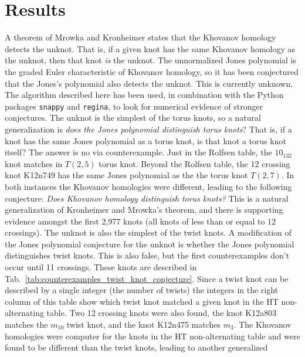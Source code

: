 \documentclass{article}
\theoremstyle{plain}
\begin{document}
    \section{Results}
        A theorem of Mrowka and Kronheimer states that the Khovanov homology
        detects the unknot. That is, if a given knot has the same Khovanov
        homology as the unknot, then that knot \textit{is} the unknot.
        The unnormalized Jones polynomial is the graded Euler characteristic of
        Khovanov homology, so it has been conjectured that the Jones's
        polynomial also detects the unknot. This is currently unknown. The
        algorithm described here has been used, in combination with the
        Python packages \texttt{snappy} and \texttt{regina}, to look for
        numerical evidence of stronger conjectures. The unknot is the simplest
        of the torus knots, so a natural generalization is
        \textit{does the Jones polynomial distinguish torus knots}? That is,
        if a knot has the same Jones polynomial as a torus knot, is that knot
        a torus knot itself? The answer is no via counterexample. Just in the
        Rolfsen table, the $10_{132}$ knot matches in $T(2,5)$ torus knot.
        Beyond the Rolfsen table, the 12 crossing knot K12n749 has the same Jones
        polynomial as the the torus knot $T(2,7)$. In both instances the
        Khovanov homologies were different, leading to the following conjecture:
        \textit{Does Khovanov homology distinguish torus knots?} This is a
        natural generalization of Kronheimer and Mrowka's theorem, and there is
        supporting evidence amongst the first 2,977 knots (all knots of less
        than or equal to 12 crossings).
        The unknot is also the simplest of the twist knots. A modification of
        the Jones polynomial conjecture for the unknot is whether the Jones
        polynomial distinguishes twist knots. This is also false, but the first
        counterexamples don't occur until 11 crossings. These knots are
        described in Tab.~\ref{tab:counterexamples_twist_knot_conjecture}. Since
        a twist knot can be described by a single integer (the number of twists)
        the integers in the right column of this table show which twist knot
        matched a given knot in the HT non-alternating table. Two 12 crossing
        knots were also found, the knot K12a803 matches the $m_{10}$ twist knot,
        and the knot K12n475 matches $m_{3}$. The Khovanov homologies were
        computer for the knots in the HT non-alternating table and were found
        to be different than the twist knots, leading to another generalized
\end{document}
